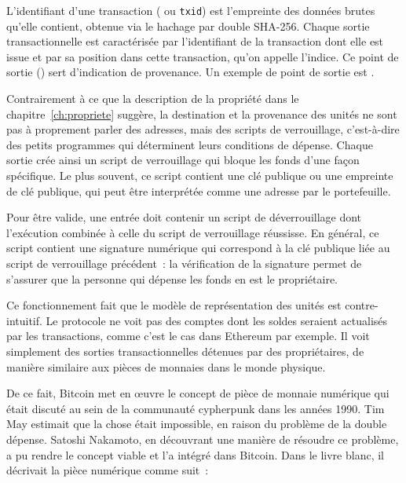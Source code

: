 L'identifiant d'une transaction ( ou \texttt{txid}) est l'empreinte des données brutes qu'elle contient, obtenue via le hachage par double SHA-256. Chaque sortie transactionnelle est caractérisée par l'identifiant de la transaction dont elle est issue et par sa position dans cette transaction, qu'on appelle l'indice. Ce point de sortie () sert d'indication de provenance. Un exemple de point de sortie est \texttt{}.

Contrairement à ce que la description de la propriété dans le chapitre~\ref{ch:propriete} suggère, la destination et la provenance des unités ne sont pas à proprement parler des adresses, mais des scripts de verrouillage, c'est-à-dire des petits programmes qui déterminent leurs conditions de dépense. Chaque sortie crée ainsi un script de verrouillage qui bloque les fonds d'une façon spécifique. Le plus souvent, ce script contient une clé publique ou une empreinte de clé publique, qui peut être interprétée comme une adresse par le portefeuille.

Pour être valide, une entrée doit contenir un script de déverrouillage dont l'exécution combinée à celle du script de verrouillage réussisse. En général, ce script contient une signature numérique qui correspond à la clé publique liée au script de verrouillage précédent~: la vérification de la signature permet de s'assurer que la personne qui dépense les fonds en est le propriétaire.

Ce fonctionnement fait que le modèle de représentation des unités est contre-intuitif. Le protocole ne voit pas des comptes dont les soldes seraient actualisés par les transactions, comme c'est le cas dans Ethereum par exemple. Il voit simplement des sorties transactionnelles détenues par des propriétaires, de manière similaire aux pièces de monnaies dans le monde physique.

De ce fait, Bitcoin met en œuvre le concept de pièce de monnaie numérique qui était discuté au sein de la communauté cypherpunk dans les années 1990. Tim May estimait que la chose était impossible, en raison du problème de la double dépense. Satoshi Nakamoto, en découvrant une manière de résoudre ce problème, a pu rendre le concept viable et l'a intégré dans Bitcoin. Dans le livre blanc, il décrivait la pièce numérique comme suit~:

